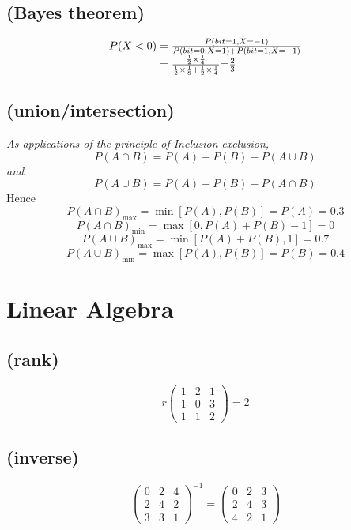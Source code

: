 \documentclass[a4paper]{exam}
\begin{document}
	  \subsection{(Bayes theorem)}
\[\begin{array}{l}
P(X < 0) = \frac{{P(bit = 1,X =  - 1)}}{{P(bit = 0,X = 1) + P(bit = 1,X =  - 1)}}\\
{\kern 1pt} {\kern 1pt} {\kern 1pt} {\kern 1pt} {\kern 1pt} {\kern 1pt} {\kern 1pt} {\kern 1pt} {\kern 1pt} {\kern 1pt} {\kern 1pt} {\kern 1pt} {\kern 1pt} {\kern 1pt} {\kern 1pt} {\kern 1pt} {\kern 1pt} {\kern 1pt} {\kern 1pt} {\kern 1pt} {\kern 1pt} {\kern 1pt} {\kern 1pt} {\kern 1pt} {\kern 1pt} {\kern 1pt} {\kern 1pt} {\kern 1pt} {\kern 1pt} {\kern 1pt} {\kern 1pt} {\kern 1pt} {\kern 1pt}  {\kern 1pt} {\kern 1pt} {\kern 1pt} {\kern 1pt} {\kern 1pt} {\kern 1pt} {\kern 1pt} {\kern 1pt} {\kern 1pt} {\kern 1pt}  = \frac{{\frac{1}{2} \times \frac{1}{4}}}{{\frac{1}{2} \times \frac{1}{8}{\rm{ + }}\frac{1}{2} \times \frac{1}{4}}}{\rm{ = }}\frac{2}{3}
\end{array}\]
	  \subsection{(union/intersection)}
	  \textit{As applications of the principle of Inclusion}-\textit{exclusion,}
	  \[P(A \cap B) = P(A) + P(B) - P(A \cup B)\]
	  \textit{and}
	  \[P(A \cup B) = P(A) + P(B) - P(A \cap B)\]
	  Hence
      \[P{(A \cap B)_{\max }} = \min [P(A),P(B)] = P(A) = 0.3\]
     \[P{(A \cap B)_{\min }} = \max [0,P(A) + P(B) - 1] = 0\]
	 \[P{(A \cup B)_{\max }} = \min [P(A) + P(B),1] = 0.7\]
	 \[P{(A \cup B)_{\min }} = \max [P(A),P(B)] = P(B) = 0.4\]
 \section{Linear Algebra}
 \subsection{(rank)}
 \[r\left( {\begin{array}{*{20}{c}}
 	1&2&1\\
 	1&0&3\\
 	1&1&2
 	\end{array}} \right) = 2\]
 \subsection{(inverse)}
 \[{\left( {\begin{array}{cccccccccccccccccccc}
 		0&2&4\\
 		2&4&2\\
 		3&3&1
 		\end{array}} \right)^{ - 1}} = \left( {\begin{array}{*{20}{c}}
 		0&2&3\\
 		2&4&3\\
 		4&2&1
 		\end{array}} \right)\]
\end{document}
